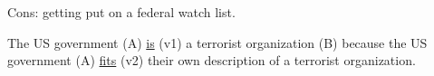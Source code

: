 \documentclass[12pt]{article}
\begin{document}
Cons: getting put on a federal watch list.

The US government (A) \uline{is} (v1) a terrorist organization (B) because the US government (A) \uline{fits} (v2) their own description of a terrorist organization.


\end{document}

